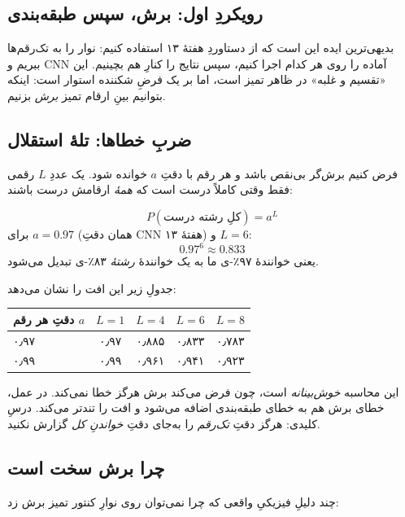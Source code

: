 \documentclass[12pt,a4paper]{article}
\begin{document}
\subsection{رویکردِ اول: برش، سپس طبقه‌بندی}

بدیهی‌ترین ایده این است که از دستاوردِ هفتهٔ ۱۳ استفاده کنیم: نوار را به تک‌رقم‌ها ببریم و CNNِ آماده را روی هر کدام اجرا کنیم، سپس نتایج را کنارِ هم بچینیم. این «تقسیم و غلبه» در ظاهر تمیز است، اما بر یک فرضِ شکننده استوار است: اینکه بتوانیم بینِ ارقام تمیز \emph{برش} بزنیم.

\subsection{ضربِ خطاها: تلهٔ استقلال}

فرض کنیم برش‌گر بی‌نقص باشد و هر رقم با دقتِ $a$ خوانده شود. یک عددِ $L$ رقمی فقط وقتی کاملاً درست است که \emph{همهٔ} ارقامش درست باشند:

\begin{riyazi}
\[
P(\text{کلِ رشته درست}) = a^{L}
\]
برای $a=0.97$ (همان دقتِ CNNِ هفتهٔ ۱۳) و $L=6$:
\[
0.97^{6} \approx 0.833
\]
یعنی خوانندهٔ ۹۷٪-ی ما به یک خوانندهٔ \emph{رشتهٔ} ۸۳٪-ی تبدیل می‌شود.
\end{riyazi}

جدولِ زیر این افت را نشان می‌دهد:

\begin{center}
\begin{tabular}{@{}lcccc@{}}
\hline
دقتِ هر رقم $a$ & $L{=}1$ & $L{=}4$ & $L{=}6$ & $L{=}8$ \\
\hline
۰٫۹۷ & ۰٫۹۷ & ۰٫۸۸۵ & ۰٫۸۳۳ & ۰٫۷۸۳ \\
۰٫۹۹ & ۰٫۹۹ & ۰٫۹۶۱ & ۰٫۹۴۱ & ۰٫۹۲۳ \\
\hline
\end{tabular}
\end{center}

\begin{nokte}
این محاسبه \emph{خوش‌بینانه} است، چون فرض می‌کند برش هرگز خطا نمی‌کند. در عمل، خطای برش هم به خطای طبقه‌بندی اضافه می‌شود و افت را تندتر می‌کند. درسِ کلیدی: هرگز دقتِ \emph{تک‌رقم} را به‌جای دقتِ \emph{خواندنِ کل} گزارش نکنید.
\end{nokte}

\subsection{چرا برش سخت است}

چند دلیلِ فیزیکیِ واقعی که چرا نمی‌توان روی نوارِ کنتور تمیز برش زد:
\end{document}
